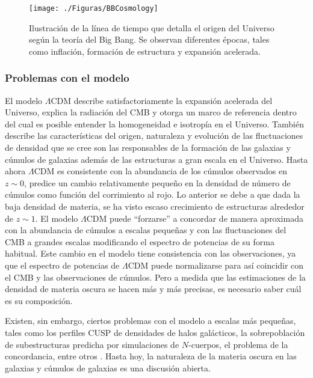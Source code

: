 \documentclass[a4paper,openright,10pt, oneside, final]{book}
\begin{document}
\begin{figure}
\centering
  \texttt{[image: ./Figuras/BBCosmology]}
  \caption{\footnotesize{Ilustración de la línea de tiempo que detalla el origen del Universo según la teoría del Big Bang. Se observan diferentes épocas, tales como inflación, formación de estructura y expansión acelerada.}}
  \label{fig 1.6}
\end{figure}



\subsubsection*{Problemas con el modelo}
El modelo $\Lambda$CDM describe satisfactoriamente la expansión acelerada del Universo, explica la radiación del CMB y otorga un marco de referencia dentro del cual es posible entender la homogeneidad e isotropía en el Universo. También describe las características del origen, naturaleza y evolución de las fluctuaciones de densidad que se cree son las responsables de la formación de las galaxias y cúmulos de galaxias además de las estructuras a gran escala en el Universo. Hasta ahora $\Lambda$CDM es consistente con la abundancia de los cúmulos observados en $z \sim 0$, predice un cambio relativamente pequeño en la densidad de número de cúmulos como función del corrimiento al rojo. Lo anterior se debe a que dada la baja densidad de materia, se ha visto escaso crecimiento de estructuras alrededor de $z \sim 1$. El modelo $\Lambda$CDM puede ``forzarse'' a concordar de manera aproximada con la abundancia de cúmulos a escalas pequeñas y con las fluctuaciones del CMB a grandes escalas modificando el espectro de potencias de su forma habitual. Este cambio en el modelo tiene consistencia con las observaciones, ya que el espectro de potencias de $\Lambda$CDM puede normalizarse para así coincidir con el CMB y las observaciones de cúmulos. Pero a medida que las estimaciones de la densidad de materia oscura se hacen más y más precisas, es necesario saber cuál es su composición.

Existen, sin embargo, ciertos problemas con el modelo a escalas más pequeñas, tales como los perfiles CUSP de densidades de halos galácticos, la sobrepoblación de subestructuras predicha por simulaciones de $N$-cuerpos, el problema de la concordancia, entre otros \cite{1.2.03}. Hasta hoy, la naturaleza de la materia oscura en las galaxias y cúmulos de galaxias es una discusión abierta.
\end{document}
